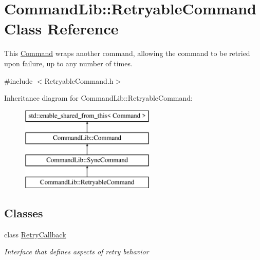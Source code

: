 \hypertarget{class_command_lib_1_1_retryable_command}{}\section{Command\+Lib\+:\+:Retryable\+Command Class Reference}
\label{class_command_lib_1_1_retryable_command}


This \mbox{\hyperlink{class_command_lib_1_1_command}{Command}} wraps another command, allowing the command to be retried upon failure, up to any number of times.  




{\ttfamily \#include $<$Retryable\+Command.\+h$>$}

Inheritance diagram for Command\+Lib\+:\+:Retryable\+Command\+:\begin{figure}[H]
\begin{center}
\leavevmode
\includegraphics[height=4.000000cm]{class_command_lib_1_1_retryable_command}
\end{center}
\end{figure}
\subsection*{Classes}
\begin{DoxyCompactItemize}
\item 
class \mbox{\hyperlink{class_command_lib_1_1_retryable_command_1_1_retry_callback}{Retry\+Callback}}
\begin{DoxyCompactList}\small\item\em Interface that defines aspects of retry behavior \end{DoxyCompactList}\end{DoxyCompactItemize}
